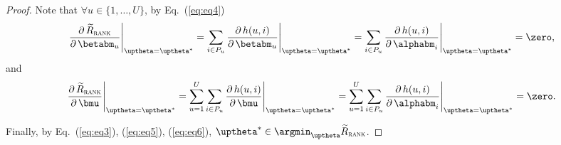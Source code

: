 \begin{proof}
Note that $\forall u \in \{1,\dots,U\}$,
by Eq.~(\ref{eq:eq4})
\begin{equation}
\label{eq:eq5}
\frac{\partial \, \widetilde R_\textsc{rank}} {\partial \, \betabm_u} \Bigg|_{\uptheta = \uptheta^*} 
= \sum_{i \in P_u} \frac{\partial \, h(u, i)}{\partial \, \betabm_u}  \Bigg|_{\uptheta = \uptheta^*}
= \sum_{i \in P_u} \frac{\partial \, h(u, i)}{\partial \, \alphabm_i} \Bigg|_{\uptheta = \uptheta^*}
= \zero,
\end{equation}
and
\begin{equation}
\label{eq:eq6}
\frac{\partial \, \widetilde R_\textsc{rank}} {\partial \, \bmu} \Bigg|_{\uptheta = \uptheta^*} 
= \sum_{u=1}^U \sum_{i \in P_u} \frac{\partial \, h(u, i)}{\partial \, \bmu} \Bigg|_{\uptheta = \uptheta^*}
= \sum_{u=1}^U \sum_{i \in P_u} \frac{\partial \, h(u, i)}{\partial \, \alphabm_i} \Bigg|_{\uptheta = \uptheta^*}
= \zero.
\end{equation}

Finally, by Eq.~(\ref{eq:eq3}), (\ref{eq:eq5}), (\ref{eq:eq6}), $\uptheta^* \in \argmin_{\uptheta} \widetilde R_\textsc{rank}$.

\end{proof}
